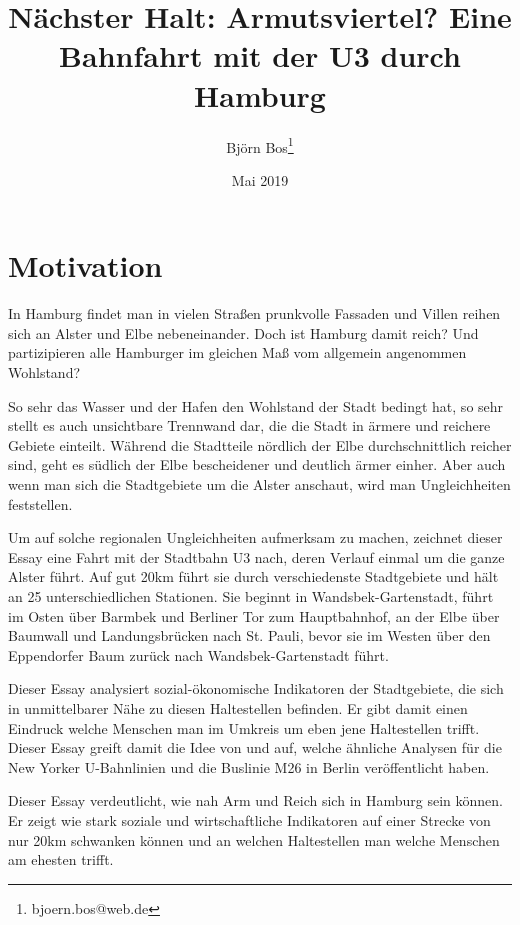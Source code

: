 \documentclass[10pt,a4paper]{article}
\begin{document}
\author{Björn Bos\thanks{bjoern.bos@web.de}}
\title{Nächster Halt: Armutsviertel? Eine Bahnfahrt mit der U3 durch Hamburg}
\date{Mai 2019}

\maketitle

\doublespacing

\section*{Motivation}
In Hamburg findet man in vielen Straßen prunkvolle Fassaden und Villen reihen sich an Alster und Elbe nebeneinander. Doch ist Hamburg damit reich? Und partizipieren alle Hamburger im gleichen Maß vom allgemein angenommen Wohlstand?

So sehr das Wasser und der Hafen den Wohlstand der Stadt bedingt hat, so sehr stellt es auch unsichtbare Trennwand dar, die die Stadt in ärmere und reichere Gebiete einteilt. Während die Stadtteile nördlich der Elbe durchschnittlich reicher sind, geht es südlich der Elbe bescheidener und deutlich ärmer einher. Aber auch wenn man sich die Stadtgebiete um die Alster anschaut, wird man Ungleichheiten feststellen.

Um auf solche regionalen Ungleichheiten aufmerksam zu machen, zeichnet dieser Essay eine Fahrt mit der Stadtbahn U3 nach, deren Verlauf einmal um die ganze Alster führt. Auf gut 20km führt sie durch verschiedenste Stadtgebiete und hält an 25 unterschiedlichen Stationen. Sie beginnt in Wandsbek-Gartenstadt, führt im Osten über Barmbek und Berliner Tor zum Hauptbahnhof, an der Elbe über Baumwall und Landungsbrücken nach St. Pauli, bevor sie im Westen über den Eppendorfer Baum zurück nach Wandsbek-Gartenstadt führt.

Dieser Essay analysiert sozial-ökonomische Indikatoren der Stadtgebiete, die sich in unmittelbarer Nähe zu diesen Haltestellen befinden. Er gibt damit einen Eindruck welche Menschen man im Umkreis um eben jene Haltestellen trifft. Dieser Essay greift damit die Idee von \citet{New_Yorker} und \citet{M29} auf, welche ähnliche Analysen für die New Yorker U-Bahnlinien und die Buslinie M26 in Berlin veröffentlicht haben.

Dieser Essay verdeutlicht, wie nah Arm und Reich sich in Hamburg sein können. Er zeigt wie stark soziale und wirtschaftliche Indikatoren auf einer Strecke von nur 20km schwanken können und an welchen Haltestellen man welche Menschen am ehesten trifft.
\end{document}
